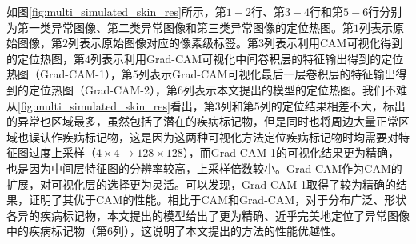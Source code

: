 如图\ref{fig:multi_simulated_skin_res}所示，第$1-2$行、第$3-4$行和第$5-6$行分别为第一类异常图像、第二类异常图像和第三类异常图像的定位热图。第$1$列表示原始图像，第$2$列表示原始图像对应的像素级标签。第$3$列表示利用CAM可视化得到的定位热图，第$4$列表示利用Grad-CAM可视化中间卷积层的特征输出得到的定位热图（Grad-CAM-1），第$5$列表示Grad-CAM可视化最后一层卷积层的特征输出得到的定位热图（Grad-CAM-2），第$6$列表示本文提出的模型的定位热图。我们不难从\ref{fig:multi_simulated_skin_res}看出，第$3$列和第$5$列的定位结果相差不大，标出的异常也区域最多，虽然包括了潜在的疾病标记物，但是同时也将周边大量正常区域也误认作疾病标记物，这是因为这两种可视化方法定位疾病标记物时均需要对特征图过度上采样（$4\times 4\rightarrow 128\times 128$），而Grad-CAM-1的可视化结果更为精确，也是因为中间层特征图的分辨率较高，上采样倍数较小。Grad-CAM作为CAM的扩展，对可视化层的选择更为灵活。可以发现，Grad-CAM-1取得了较为精确的结果，证明了其优于CAM的性能。相比于CAM和Grad-CAM，对于分布广泛、形状各异的疾病标记物，本文提出的模型给出了更为精确、近乎完美地定位了异常图像中的疾病标记物（第$6$列），这说明了本文提出的方法的性能优越性。

